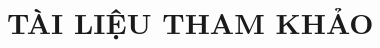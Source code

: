 \chapter{TÀI LIỆU THAM KHẢO}
\renewcommand{\bibfont}{\fontsize{13pt}{18pt}\selectfont}
\printbibliography[heading=none]